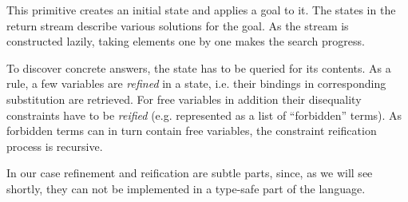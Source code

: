 This primitive creates an initial state and applies a goal to it. The states in the return stream describe
various solutions for the goal. As the stream is constructed lazily, taking elements one by one makes
the search progress. 

To discover concrete answers, the state has to be queried for its contents. As a rule, a few variables
are \emph{refined} in a state, i.e. their bindings in corresponding substitution are retrieved. For free
variables in addition their disequality constraints have to be \emph{reified} (e.g. represented as a list of
``forbidden'' terms). As forbidden terms can in turn contain free variables, the constraint reification
process is recursive.

In our case refinement and reification are subtle parts, since, as we will see shortly, they can not be
implemented in a type-safe part of the language. 

